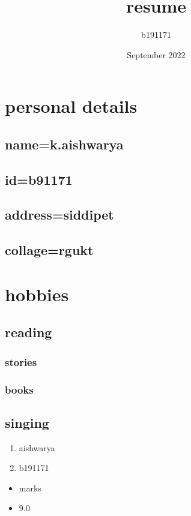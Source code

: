 \documentclass{article}
\title{resume}
\author{b191171 }
\date{September 2022}
\begin{document}
\maketitle

\section{personal details}
\subsection{name=k.aishwarya}
\subsection{id=b91171}
\subsection{address=siddipet}
\subsection{collage=rgukt}
\section{hobbies}
\subsection{reading}
\subsubsection{stories}
\subsubsection{books}
\subsection{singing}
\begin{enumerate}
    \item aishwarya
    \item b191171
\end{enumerate}
\begin{itemize}
    \item marks
    \item 9.0
\end{itemize}
\end{document}
